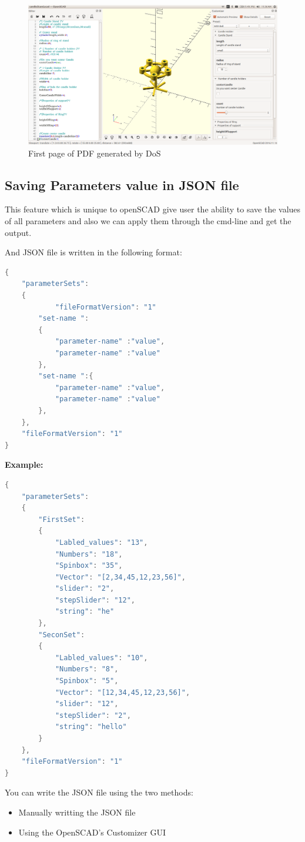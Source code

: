 \begin{figure}[H] 
	\centering \includegraphics[scale=0.31]{images/output/6.png}
	\caption{First page of PDF generated by DoS}
	\label{fig:5}
\end{figure}

\subsection{ Saving Parameters value in JSON file}
This feature which is unique to openSCAD give user the ability to save the values of all parameters and also we can apply them through the cmd-line and get the output.

And JSON file is written in the following format:

\begin{lstlisting}[language=Java]
{
	"parameterSets":
	{
		    "fileFormatVersion": "1"
		"set-name ":
		{
			"parameter-name" :"value",
			"parameter-name" :"value"
		},
		"set-name ":{
			"parameter-name" :"value",
			"parameter-name" :"value"
		},
	},
	"fileFormatVersion": "1"
}
\end{lstlisting}

\textbf{Example:}
\begin{lstlisting}[language=Java]
{
	"parameterSets":
	{
		"FirstSet":
		{
			"Labled_values": "13",
			"Numbers": "18",
			"Spinbox": "35",
			"Vector": "[2,34,45,12,23,56]",
			"slider": "2",
			"stepSlider": "12",
			"string": "he"
		},
		"SeconSet":
		{
			"Labled_values": "10",
			"Numbers": "8",
			"Spinbox": "5",
			"Vector": "[12,34,45,12,23,56]",
			"slider": "12",
			"stepSlider": "2",
			"string": "hello"
		}
	},
	"fileFormatVersion": "1"
}
\end{lstlisting}

You can write the JSON file using the two methods:
\begin{itemize}
	\item Manually writting the JSON file
	\item Using the OpenSCAD's Customizer GUI
\end{itemize}


